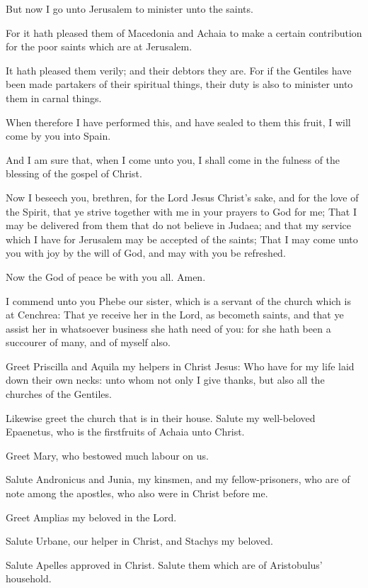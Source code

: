 \Verse But now I go unto Jerusalem to minister unto the saints.

\Verse For it hath pleased them of Macedonia and Achaia to make a certain contribution for the poor saints which are at Jerusalem.

\Verse It hath pleased them verily; and their debtors they are. For if the Gentiles have been made partakers of their spiritual things, their duty is also to minister unto them in carnal things.

\Verse When therefore I have performed this, and have sealed to them this fruit, I will come by you into Spain.

\Verse And I am sure that, when I come unto you, I shall come in the fulness of the blessing of the gospel of Christ.

\Verse Now I beseech you, brethren, for the Lord Jesus Christ's sake, and for the love of the Spirit, that ye strive together with me in your prayers to God for me; \Verse That I may be delivered from them that do not believe in Judaea; and that my service which I have for Jerusalem may be accepted of the saints; \Verse That I may come unto you with joy by the will of God, and may with you be refreshed.

\Verse Now the God of peace be with you all. Amen.


\Chapter
\Verse I commend unto you Phebe our sister, which is a servant of the church which is at Cenchrea: \Verse That ye receive her in the Lord, as becometh saints, and that ye assist her in whatsoever business she hath need of you: for she hath been a succourer of many, and of myself also.

\Verse Greet Priscilla and Aquila my helpers in Christ Jesus: \Verse Who have for my life laid down their own necks: unto whom not only I give thanks, but also all the churches of the Gentiles.

\Verse Likewise greet the church that is in their house. Salute my well-beloved Epaenetus, who is the firstfruits of Achaia unto Christ.

\Verse Greet Mary, who bestowed much labour on us.

\Verse Salute Andronicus and Junia, my kinsmen, and my fellow-prisoners, who are of note among the apostles, who also were in Christ before me.

\Verse Greet Amplias my beloved in the Lord.

\Verse Salute Urbane, our helper in Christ, and Stachys my beloved.

\Verse Salute Apelles approved in Christ. Salute them which are of Aristobulus' household.

